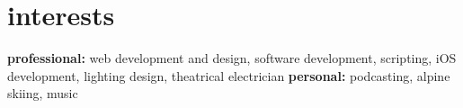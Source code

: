\documentclass[]{cv-style} %
\begin{document}

%
%
%
%
%


\section{interests}

\textbf{professional:} web development and design, software development, scripting, iOS development, lighting design, theatrical electrician \textbf{personal:} podcasting, alpine skiing, music
\end{document}
